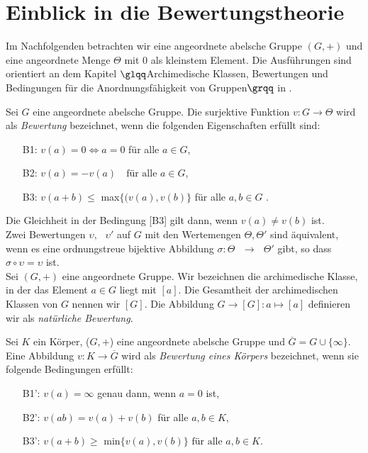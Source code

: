 \section{Einblick in die Bewertungstheorie}
Im Nachfolgenden betrachten wir eine angeordnete abelsche Gruppe $\left(G,+\right)$ und eine angeordnete Menge $\Theta$ mit $0$ als kleinstem Element. Die Ausführungen sind orientiert an dem Kapitel $\glqq$Archimedische Klassen, Bewertungen und Bedingungen für die Anordnungsfähigkeit von Gruppen$\grqq$ in \cite[S. 9 - 11]{priesscrampe83}.
%
%
\begin{defn} %
Sei $G$ eine angeordnete abelsche Gruppe. Die surjektive Funktion $v\colon G \rightarrow \Theta$ wird als \textit{Bewertung} bezeichnet, wenn die folgenden Eigenschaften erfüllt sind:
%
\begin{enumerate}
\item[B1:] $v{(a)} = 0 \Leftrightarrow a = 0$ für alle $a\in G$,
\item[B2:]  $v{(a)} = -v{(a)} \text{  } \text{ für alle } a \in G $,
\item[B3:] $ v{(a+ b)} \le$ max$\{(v{(a)}, v{(b)}\}$ für alle $ a, b \in G$ .
\end{enumerate}
%
\end{defn}
Die Gleichheit in der Bedingung [B3] gilt dann, wenn $v{(a)} \ne v{(b)} $ ist.\\
 Zwei Bewertungen $\upsilon, \text{ } \upsilon' $ auf $G$ mit den Wertemengen $\Theta , \Theta' $ sind äquivalent, wenn es eine ordnungstreue bijektive Abbildung $\sigma \colon \Theta \text{ } \rightarrow \text{ } \Theta' $ gibt, so dass $ \sigma \circ \upsilon = \upsilon  $ ist.\\
Sei $\left(G, +\right)$ eine angeordnete Gruppe. Wir bezeichnen die archimedische Klasse, in der das Element $a\in G$ liegt  mit $[a]$. Die Gesamtheit der archimedischen Klassen von $G$ nennen wir $[G]$. Die Abbildung $G \to [G] \colon a \mapsto [a]$ definieren wir als \textit{natürliche Bewertung}. %
\begin{defn}  \label{bewKoerper} %
Sei $K$ ein Körper, ($G, +$) eine angeordnete abelsche Gruppe und $\overline{G}  = G \cup \lbrace\infty\rbrace $. Eine Abbildung $v\colon K \to \overline{G} $ wird als \textit{Bewertung eines Körpers} bezeichnet, wenn sie folgende Bedingungen erfüllt:
\begin{enumerate}
\item[B1':] $v(a) = \infty$ genau dann, wenn $a = 0$ ist,
\item[B2':] $v(ab) = v\left(a\right)+v\left(b\right) $ für alle $ a, b \in K$,
\item[B3':] $v\left(a+b\right) \ge $ min$\lbrace v(a),v\left(b \right)\rbrace \text{ für alle }  a, b \in K. $
\end{enumerate}
\end{defn}
